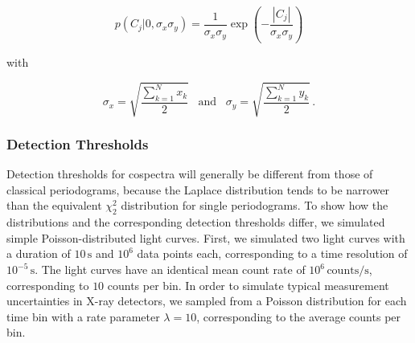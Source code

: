 \documentclass[12pt]{emulateapj}
\begin{document}
\begin{equation}
p(C_j | 0, \sigma_x\sigma_y) = \frac{1}{\sigma_x \sigma_y} \exp{\left(- \frac{|C_j|}{\sigma_x\sigma_y} \right)} 
\label{eqn:laplace}
\end{equation}

\noindent with

\begin{equation}
\sigma_x =  \sqrt{\frac{\sum_{k=1}^{N}{x_k}}{2}} \;\;\; \mathrm{and} \;\;\; \sigma_y =  \sqrt{\frac{\sum_{k=1}^{N}{y_k}}{2}} \, .
\label{eqn:csdist}
\end{equation}


\subsubsection{Detection Thresholds}
\label{sec:detectionthresholds}

Detection thresholds for cospectra will generally be different from those of classical periodograms, because the Laplace distribution tends to be narrower than the equivalent $\chi^2_2$ distribution for single periodograms. To show how the distributions and the corresponding detection thresholds differ, we simulated simple Poisson-distributed light curves. First, we simulated two light curves with a duration of $10\,\mathrm{s}$ and $10^6$ data points each, corresponding to a time resolution of $10^{-5}\,\mathrm{s}$. The light curves have an identical mean count rate of $10^{6} \, \mathrm{counts/s}$, corresponding to $10$ counts per bin. In order to simulate typical measurement uncertainties in X-ray detectors, we sampled from a Poisson distribution for each time bin with a rate parameter $\lambda = 10$, corresponding to the average counts per bin.
\end{document}
